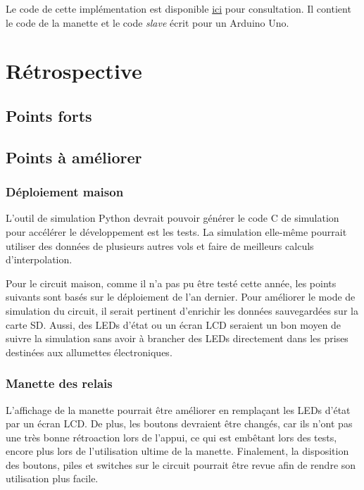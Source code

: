 Le code de cette implémentation est disponible
\href{https://github.com/ul-gaul/manette}{ici} pour consultation. Il contient
le code de la manette et le code \textit{slave} écrit pour un Arduino Uno.

\section{Rétrospective}

\subsection{Points forts}



\subsection{Points à améliorer}

\subsubsection{Déploiement maison}

L'outil de simulation Python devrait pouvoir générer le code C de simulation
pour accélérer le développement est les tests. La simulation elle-même pourrait
utiliser des données de plusieurs autres vols et faire de meilleurs calculs
d'interpolation.
\\
\par
Pour le circuit maison, comme il n'a pas pu être testé cette année, les points
suivants sont basés sur le déploiement de l'an dernier. Pour améliorer le mode
de simulation du circuit, il serait pertinent d'enrichir les données
sauvegardées sur la carte SD. Aussi, des LEDs d'état ou un écran LCD seraient
un bon moyen de suivre la simulation sans avoir à brancher des LEDs directement
dans les prises destinées aux allumettes électroniques.

\subsubsection{Manette des relais}

L'affichage de la manette pourrait être améliorer en remplaçant les LEDs d'état
par un écran LCD. De plus, les boutons devraient être changés, car ils n'ont
pas une très bonne rétroaction lors de l'appui, ce qui est embêtant lors des
tests, encore plus lors de l'utilisation ultime de la manette. Finalement, la
disposition des boutons, piles et switches sur le circuit pourrait être revue
afin de rendre son utilisation plus facile.
